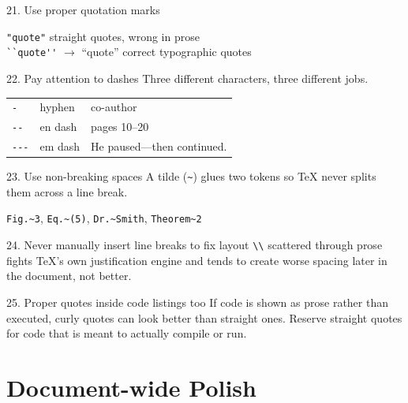 \documentclass[11pt]{article}
\begin{document}
\begin{tipbox}{21. Use proper quotation marks}
\end{tipbox}
\begin{center}
\verb|"quote"| \hfill straight quotes, wrong in prose\\
\verb|``quote''| $\to$ ``quote'' \hfill correct typographic quotes
\end{center}

\begin{tipbox}{22. Pay attention to dashes}
Three different characters, three different jobs.
\end{tipbox}
\begin{center}
\begin{tabular}{lll}
\texttt{-} & hyphen & co-author\\
\texttt{-{}-} & en dash & pages 10--20\\
\texttt{-{}-{}-} & em dash & He paused---then continued.
\end{tabular}
\end{center}

\begin{tipbox}{23. Use non-breaking spaces}
A tilde (\texttt{\textasciitilde}) glues two tokens so TeX never splits
them across a line break.
\end{tipbox}
\begin{center}
\texttt{Fig.\textasciitilde 3}, \texttt{Eq.\textasciitilde(5)}, \texttt{Dr.\textasciitilde Smith}, \texttt{Theorem\textasciitilde 2}
\end{center}

\begin{tipbox}{24. Never manually insert line breaks to fix layout}
\texttt{\textbackslash\textbackslash} scattered through prose fights
TeX's own justification engine and tends to create worse spacing later
in the document, not better.
\end{tipbox}

\begin{tipbox}{25. Proper quotes inside code listings too}
If code is shown as prose rather than executed, curly quotes can look
better than straight ones. Reserve straight quotes for code that is
meant to actually compile or run.
\end{tipbox}

\section{Document-wide Polish}
\end{document}
